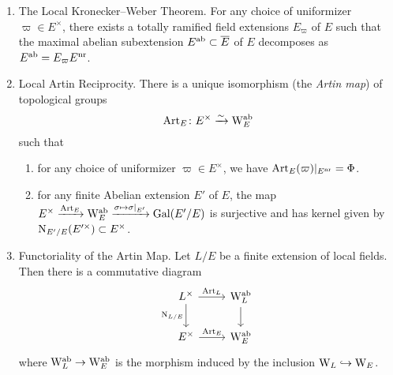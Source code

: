 \documentclass[../main.tex]{subfiles}
\begin{document}
\begin{thm}\label{thm:LocalKroneckerWeber} \leavevmode
  \vspace{-0.5em}
  \begin{enumerate}
    \item \textnormal{The Local Kronecker--Weber Theorem.} For any choice of
      uniformizer $\varpi \in E^\times$, there exists a 
      totally ramified field extensions $E_\varpi$ of $E$ such that 
      the maximal abelian subextension $E^{\mathrm{ab}} \subset \overline E$ of $E$
      decomposes as $E^{\mathrm{ab}} = E_\varpi E^{\mathrm{nr}}$.     
    \item \textnormal{Local Artin Reciprocity.} There is a unique isomorphism
      (the \emph{Artin map}) of topological groups
      \begin{equation*}
        \operatorname{Art}_E\colon E^\times \xrightarrow{\sim} \mathrm W_E^{\mathrm{ab}}
      \end{equation*}
      such that 
      \begin{enumerate}
        \item for any choice of uniformizer $\varpi \in E^\times$, we have
          $\operatorname{Art}_E(\varpi)|_{E^{\mathrm{nr}}} = \Phi$.
        \item for any finite Abelian extension $E'$ of $E$, the
          map $E^\times \xrightarrow{\operatorname{Art}_E} \mathrm W_E^{\mathrm{ab}} \xrightarrow{\sigma \mapsto
          \sigma|_{E'}} \operatorname{Gal}(E'/E)$ is surjective and has kernel given by
          $\operatorname{N}_{E'/E}(E'^\times) \subset E^\times$. 
      \end{enumerate}
    \item \textnormal{Functoriality of the Artin Map.}
        Let $L/E$ be a finite extension of local fields. Then there is a
        commutative diagram
        \begin{equation*}
        \begin{tikzcd}[ampersand replacement=\&]
        	{L^\times} \& {\Weil_L^\ab} \\
        	{E^\times} \& {\Weil_E^\ab}
        	\arrow["{\Art_L}", from=1-1, to=1-2]
        	\arrow["{\Norm_{L/E}}"', from=1-1, to=2-1]
          \arrow[from=1-2, to=2-2]
        	\arrow["{\Art_E}", from=2-1, to=2-2]
        \end{tikzcd}
        \end{equation*}
        where $\mathrm W_L^{\mathrm{ab}} \to \mathrm W_E^{\mathrm{ab}}$ is the morphism induced by the
        inclusion $\mathrm W_L \hookrightarrow \mathrm W_E$.
  \end{enumerate}
\end{thm}
\end{document}
